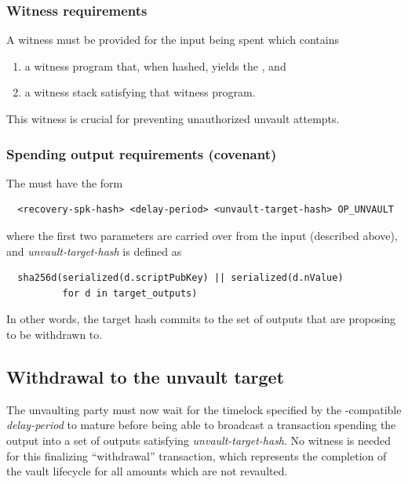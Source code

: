 \documentclass[10pt]{article}
\begin{document}
\subsubsection*{Witness requirements}

A witness must be provided for the \opv{} input being spent which contains

\begin{enumerate}
  \item a witness program \spk{} that, when hashed, yields the
    , and
  \item a witness stack satisfying that witness program.
\end{enumerate}
This witness is crucial for preventing unauthorized unvault attempts.

\subsubsection*{Spending output requirements (covenant)}

The \opuv{} \spk{} must have the form

\begin{verbatim}
  <recovery-spk-hash> <delay-period> <unvault-target-hash> OP_UNVAULT 
\end{verbatim}

\noindent where the first two parameters are carried over from the input \opv{}
(described above), and
\emph{unvault-target-hash} is defined as

\begin{verbatim}
  sha256d(serialized(d.scriptPubKey) || serialized(d.nValue)
          for d in target_outputs)
\end{verbatim}

In other words, the target hash commits to the set of outputs that are proposing to be
withdrawn to. 

\subsection*{Withdrawal to the unvault target}

The unvaulting party must now wait for the timelock specified by the
\cite{Bip68}-compatible
\emph{delay-period} to mature before being able to broadcast a transaction spending the
\opuv{} output into a set of outputs satisfying \emph{unvault-target-hash}. No witness
is needed for this finalizing ``withdrawal'' transaction, which represents the
completion of the vault lifecycle for all amounts which are not revaulted.
\end{document}
